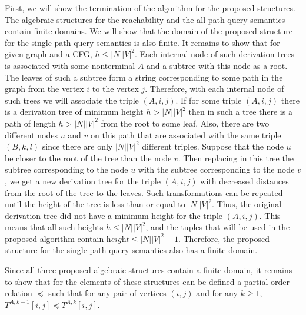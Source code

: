 First, we will show the termination of the algorithm for the proposed structures. The algebraic structures for the reachability and the all-path query semantics contain finite domains. We will show that the domain of the proposed structure for the single-path query semantics is also finite. It remains to show that for given graph and a CFG, $h \leq |N||V|^2$. Each internal node of such derivation trees is associated with some nonterminal $A$ and a subtree with this node as a root. The leaves of such a subtree form a string corresponding to some path in the graph from the vertex $i$ to the vertex $j$. Therefore, with each internal node of such trees we will associate the triple $(A, i, j)$. If for some triple $(A, i, j)$ there is a derivation tree of minimum height $h > |N||V|^2$ then in such a tree there is a path of length $h > |N||V|^2$ from the root to some leaf. Also, there are two different nodes $u$ and $v$ on this path that are associated with the same triple $(B, k, l)$ since there are only $|N||V|^2$ different triples. Suppose that the node $u$ be closer to the root of the tree than the node $v$. Then replacing in this tree the subtree corresponding to the node $u$ with the subtree corresponding to the node $v$, we get a new derivation tree for the triple $(A, i, j)$ with decreased distances from the root of the tree to the leaves. Such transformations can be repeated until the height of the tree is less than or equal to $|N||V|^2$. Thus, the original derivation tree did not have a minimum height for the triple $(A, i, j)$. This means that all such heights $h \leq |N||V|^2$, and the tuples that will be used in the proposed algorithm contain $\textit{height} \leq |N||V|^2 + 1$. Therefore, the proposed structure for the single-path query semantics also has a finite domain.

Since all three proposed algebraic structures contain a finite domain, it remains to show that for the elements of these structures can be defined a partial order relation $\preceq$ such that for any pair of vertices $(i, j)$ and for any $k \geq 1$, $T^{A, k - 1}[i, j] \preceq T^{A, k}[i, j]$.

